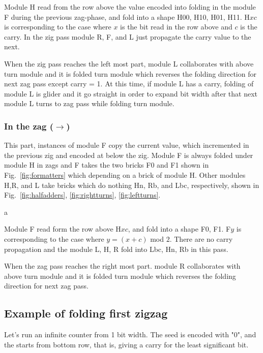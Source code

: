 \documentclass[runningheads]{llncs}
\begin{document}
Module H read from the row above the value encoded into folding in the module F during the previous zag-phase, and fold into a shape H00, H10, H01, H11.
H$xc$ is corresponding to the case where $x$ is the bit read in the row above and $c$ is the carry. 
In the zig pass module R, F, and L just propagate the carry value to the next.

When the zig pass reaches the left most part, module L collaborates with above turn module and it is folded turn module which reverses the folding direction for next zag pass except carry = 1.
At this time, if module L has a carry, folding of module L is glider and it go straight in order to expand bit width after that next module L turns to zag pass while folding turn module.

\subsubsection{In the zag ($\rightarrow$)}
This part, instances of module F copy the current value, which incremented in the previous zig and encoded at below the zig.
Module F is always folded under module H in zags and F takes the two bricks F0 and F1 shown in Fig.~\ref{fig:formatters} which depending on a brick of module H.
Other modules H,R, and L take bricks which do nothing Hn, Rb, and Lbc, respectively, shown in Fig.~\ref{fig:halfadders}, \ref{fig:rightturns}, \ref{fig:leftturns}. 

a


Module F read form the row above H$xc$, and fold into a shape F0, F1.
F$y$ is corresponding to the case where $y = (x + c)$ mod $2$.
There are no carry propagation and the module L, H, R fold into Lbc, Hn, Rb in this pass.

When the zag pass reaches the right most part. module R collaborates with above turn module and it is folded turn module which reverses the folding direction for next zag pass.

\subsection{Example of folding first zigzag}
Let's run an infinite counter from 1 bit width.
The seed is encoded with "0", and the starts from bottom row, that is, giving a carry for the least significant bit.
\end{document}
